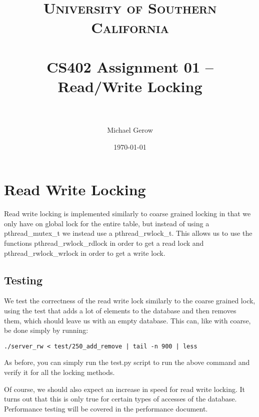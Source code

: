 \documentclass[paper=a4, fontsize=11pt]{scrartcl} %
\title{	
\normalfont \normalsize 
\textsc{University of Southern California} \\ [25pt] %
\horrule{0.5pt} \\[0.4cm] %
\huge CS402 Assignment 01 -- Read/Write Locking \\ %
\horrule{2pt} \\[0.5cm] %
}
\author{Michael Gerow} %
\date{\normalsize\today} %
\numberwithin{equation}{section} %
\numberwithin{figure}{section} %
\numberwithin{table}{section} %
\begin{document}
\maketitle %


\section{Read Write Locking}
Read write locking is implemented similarly to coarse grained locking in that we only have on global lock for the entire table, but instead of using a pthread\_mutex\_t we instead use a pthread\_rwlock\_t. This allows us to use the functions pthread\_rwlock\_rdlock in order to get a read lock and pthread\_rwlock\_wrlock in order to get a write lock.

\subsection{Testing}
We test the correctness of the read write lock similarly to the coarse grained lock, using the test that adds a lot of elements to the database and then removes them, which should leave us with an empty database. This can, like with coarse, be done simply by running:

\begin{verbatim}
./server_rw < test/250_add_remove | tail -n 900 | less
\end{verbatim}

As before, you can simply run the test.py script to run the above command and verify it for all the locking methods.

Of course, we should also expect an increase in speed for read write locking.  It turns out that this is only true for certain types of accesses of the database. Performance testing will be covered in the performance document.
\end{document}
